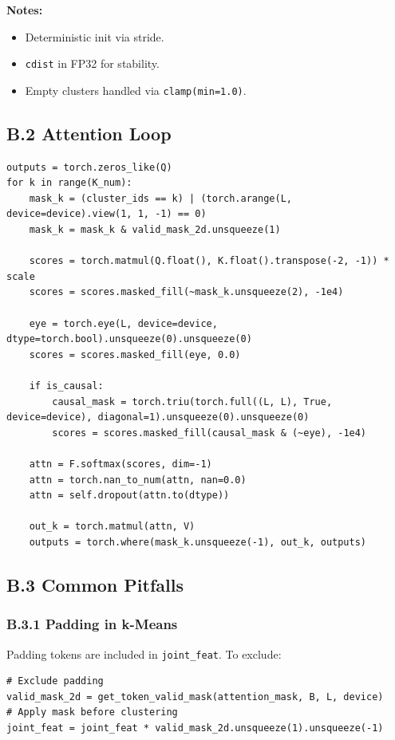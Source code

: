 \textbf{Notes:}
\begin{itemize}
\item Deterministic init via stride.
\item \texttt{cdist} in FP32 for stability.
\item Empty clusters handled via \texttt{clamp(min=1.0)}.

\end{itemize}
\subsection{B.2 Attention Loop}

\begin{lstlisting}
outputs = torch.zeros_like(Q)
for k in range(K_num):
    mask_k = (cluster_ids == k) | (torch.arange(L, device=device).view(1, 1, -1) == 0)
    mask_k = mask_k & valid_mask_2d.unsqueeze(1)

    scores = torch.matmul(Q.float(), K.float().transpose(-2, -1)) * scale
    scores = scores.masked_fill(~mask_k.unsqueeze(2), -1e4)

    eye = torch.eye(L, device=device, dtype=torch.bool).unsqueeze(0).unsqueeze(0)
    scores = scores.masked_fill(eye, 0.0)

    if is_causal:
        causal_mask = torch.triu(torch.full((L, L), True, device=device), diagonal=1).unsqueeze(0).unsqueeze(0)
        scores = scores.masked_fill(causal_mask & (~eye), -1e4)

    attn = F.softmax(scores, dim=-1)
    attn = torch.nan_to_num(attn, nan=0.0)
    attn = self.dropout(attn.to(dtype))

    out_k = torch.matmul(attn, V)
    outputs = torch.where(mask_k.unsqueeze(-1), out_k, outputs)
\end{lstlisting}

\subsection{B.3 Common Pitfalls}

\subsubsection{B.3.1 Padding in k-Means}

Padding tokens are included in \texttt{joint\_feat}. To exclude:

\begin{lstlisting}
# Exclude padding
valid_mask_2d = get_token_valid_mask(attention_mask, B, L, device)
# Apply mask before clustering
joint_feat = joint_feat * valid_mask_2d.unsqueeze(1).unsqueeze(-1)
\end{lstlisting}

